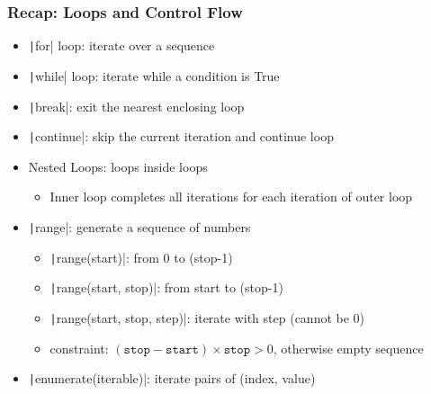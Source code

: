 \documentclass{beamer}
\newcommand{\python}[1]{\texttt|#1|}
\begin{document}
\begin{frame}[fragile]
    \frametitle{Recap: Loops and Control Flow}
    \begin{itemize}
        \item \python{for} loop: iterate over a sequence
        \item \python{while} loop: iterate while a condition is True
        \item \python{break}: exit the nearest enclosing loop
        \item \python{continue}: skip the current iteration and continue loop
        \item Nested Loops: loops inside loops
              \begin{itemize}
                  \item Inner loop completes all iterations for each iteration of outer loop
              \end{itemize}
        \item \python{range}: generate a sequence of numbers
              \begin{itemize}
                  \item \python{range(start)}: from 0 to (stop-1)
                  \item \python{range(start, stop)}: from start to (stop-1)
                  \item \python{range(start, stop, step)}: iterate with step (cannot be 0)
                  \item constraint: $(\texttt{stop} - \texttt{start}) \times \texttt{stop} > 0$, otherwise empty sequence
              \end{itemize}
        \item \python{enumerate(iterable)}: iterate pairs of (index, value)
    \end{itemize}
\end{frame}
\end{document}
